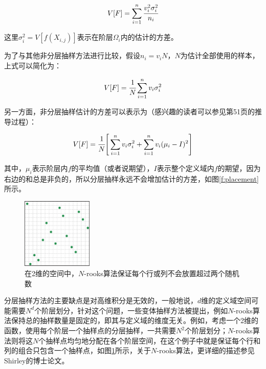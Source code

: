 \begin{equation}
	V[F]=\sum_{i=1}^{n} \cfrac{v_{i}^2 \sigma_{i}^2}{n_i}
\end{equation}

\noindent 这里$\sigma_{i}^2=V[f(X_{i,j})]$表示在阶层$\Omega_i$内的估计的方差。

为了与其他非分层抽样方法进行比较，假设$n_i=v_iN$，$N$为估计全部使用的样本，上式可以简化为：

\begin{equation}
	V[F]= \cfrac{1}{N}\sum_{i=1}^{n}v_{i} \sigma_{i}^2
\end{equation}

另一方面，非分层抽样估计的方差可以表示为（感兴趣的读者可以参见\cite{a:RobustMonteCarloMethodsforLightTransportSimulation}第51页的推导过程）：

\begin{equation}
	V[F]= \cfrac{1}{N}\Bigg[ \sum_{i=1}^{n}v_{i} \sigma_{i}^2 +\sum_{i=1}^{n}v_i(\mu_i-I)^2   \Bigg]
\end{equation}

\noindent 其中，$\mu_i$表示阶层内$f$的平均值（或者说期望），$I$表示整个定义域内$f$的期望，因为右边的和总是非负的，所以分层抽样永远不会增加估计的方差，如图\ref{f:placement}所示。

\begin{figure}
\sidecaption
	\includegraphics[width=0.3\textwidth]{figures/mc/mc-12-3}
	\caption{在2维的空间中，$N$-rooks算法保证每个行或列不会放置超过两个随机数}
	\label{f:n-rooks}
\end{figure}

分层抽样方法的主要缺点是对高维积分是无效的，一般地说，$d$维的定义域空间可能需要$N^d$个阶层划分，针对这个问题，一些变体抽样方法被提出，例如$N$-rooks算法保持总的抽样数量是固定的，即其与定义域的维度无关。例如，考虑一个2维的函数，使用每个阶层一个抽样点的分层抽样，一共需要$N^2$个阶层划分；$N$-rooks算法则将这$N$个抽样点均匀地分配在各个阶层空间，在这个例子中就是保证每个行和列的组合只包含一个抽样点，如图\ref{f:n-rooks}所示，关于$N$-rooks算法，更详细的描述参见Shirley的博士论文\cite{a:PhysicallyBasedLightingCalculationsForComputerGraphics}。

